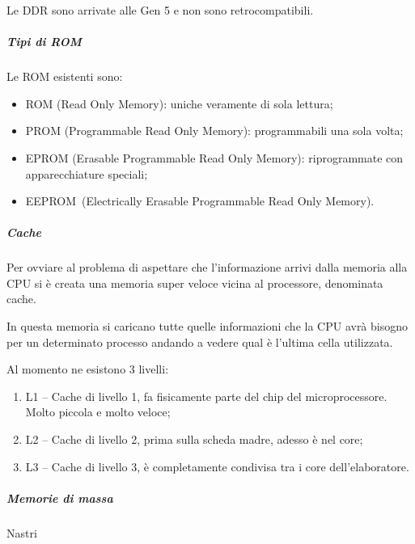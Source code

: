 \documentclass[
]{article}
\providecommand{\tightlist}{%
  \setlength{\itemsep}{0pt}\setlength{\parskip}{0pt}}
\begin{document}
{Le DDR sono arrivate alle Gen 5 e non sono retrocompatibili.}

{}

{}

{}

\subparagraph{\texorpdfstring{{Tipi di
ROM}}{Tipi di ROM}}\label{h.f4u4p197qkjx}

{Le ROM esistenti sono:}

\begin{itemize}
\tightlist
\item
  {ROM }{(Read Only Memory): uniche veramente di sola lettura;}
\item
  {PROM }{(Programmable Read Only Memory): programmabili una sola
  volta;}
\item
  {EPROM }{(Erasable Programmable Read Only Memory): riprogrammate con
  apparecchiature speciali;}
\item
  {EEPROM}{~(Electrically Erasable Programmable Read Only Memory).}
\end{itemize}

{}

\subparagraph{\texorpdfstring{{Cache}}{Cache}}\label{h.di5gs987ivj2}

{Per ovviare al problema di aspettare che l'informazione arrivi dalla
memoria alla CPU si è creata una memoria super veloce vicina al
processore, denominata }{cache}{.}

{In questa memoria si caricano tutte quelle informazioni che la CPU avrà
bisogno per un determinato processo andando a vedere qual è l'ultima
cella utilizzata.}

{}

{Al momento ne esistono 3 livelli:}

{}

\begin{enumerate}
\tightlist
\item
  {L1 -- Cache di livello 1}{, fa fisicamente parte del chip del
  microprocessore. Molto piccola e molto veloce;}
\item
  {L2 -- Cache di livello 2}{, prima sulla scheda madre, adesso è nel
  core;}
\item
  {L3 -- Cache di livello 3}{, è completamente condivisa tra i core
  dell'elaboratore.}
\end{enumerate}

{}

\subparagraph{\texorpdfstring{{Memorie di
massa}}{Memorie di massa}}\label{h.nifrez2xausa}

{Nastri}
\end{document}
